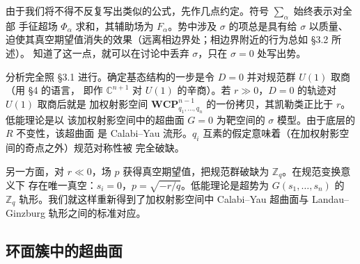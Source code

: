由于我们将不得不反复写出类似的公式，先作几点约定。符号 $\sum_\alpha$ 始终表示对全部
手征超场 $\Phi_\alpha$ 求和，其辅助场为 $F_\alpha$。势中涉及 $\sigma$ 的项总是具有给 $\sigma$
以质量、迫使其真空期望值消失的效果（远离相边界处；相边界附近的行为总如 §3.2 所述）。
知道了这一点，就可以在讨论中丢弃 $\sigma$，只在 $\sigma=0$ 处写出势。

分析完全照 §3.1 进行。确定基态结构的一步是令 $D=0$ 并对规范群 $U(1)$ 取商（用 §4 的语言，
即作 $\mathbb{C}^{n+1}$ 对 $U(1)$ 的辛商）。若 $r\gg0$，$D=0$ 的轨迹对 $U(1)$ 取商后就是
加权射影空间 $\mathbf{WCP}^{n-1}_{q_1,\dots,q_n}$ 的一份拷贝，其凯勒类正比于 $r$。低能理论是以
该加权射影空间中的超曲面 $G=0$ 为靶空间的 $\sigma$ 模型。由于底层的 $R$ 不变性，该超曲面
是 Calabi--Yau 流形。$q_i$ 互素的假定意味着（在加权射影空间的奇点之外）规范对称性被
完全破缺。

另一方面，对 $r\ll0$，场 $p$ 获得真空期望值，把规范群破缺为 $\mathbb{Z}_q$。在规范变换意义下
存在唯一真空：$s_i=0$，$p=\sqrt{-r/q}$。低能理论是超势为 $G(s_1,\dots,s_n)$ 的
$\mathbb{Z}_q$ 轨形。我们就这样重新得到了加权射影空间中 Calabi--Yau 超曲面与
Landau--Ginzburg 轨形之间的标准对应。

\label{op:52}

\subsection{环面簇中的超曲面}

